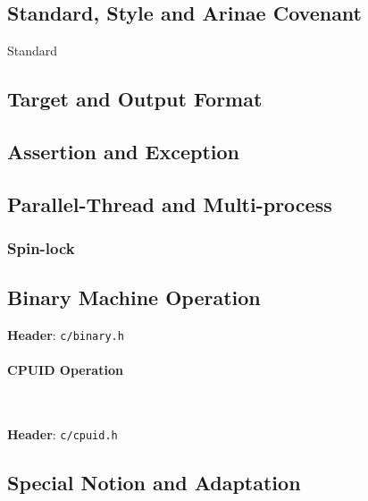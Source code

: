 \subsection{Standard, Style and Arinae Covenant}

{Standard}



\subsection{Target and Output Format}





\subsection{Assertion and Exception}





\subsection{Parallel-Thread and Multi-process}



\subsubsection{Spin-lock}



\subsection{Binary Machine Operation}

\textbf{Header}: \verb|c/binary.h|



\paragraph{CPUID Operation} \

 

\textbf{Header}: \verb|c/cpuid.h|



\subsection{Special Notion and Adaptation}

